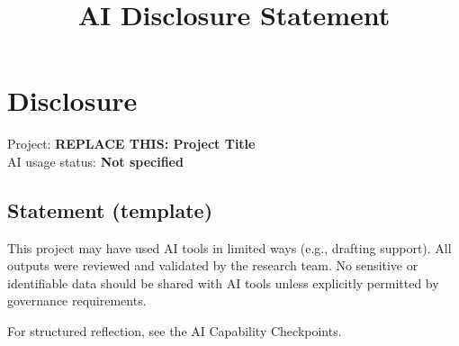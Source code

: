 \documentclass[
]{report}
\title{AI Disclosure Statement}
\author{}
\date{}
\renewcommand*\contentsname{Table of contents}
\newcommand\contentsname{Table of contents}
\begin{document}
\maketitle

\renewcommand*\contentsname{Table of contents}
{
\hypersetup{linkcolor=}
\setcounter{tocdepth}{2}
\tableofcontents
}

\chapter{Disclosure}\label{disclosure}

Project: \textbf{REPLACE THIS: Project Title}\\
AI usage status: \textbf{Not specified}

\section{Statement (template)}\label{statement-template}

This project may have used AI tools in limited ways (e.g., drafting
support). All outputs were reviewed and validated by the research team.
No sensitive or identifiable data should be shared with AI tools unless
explicitly permitted by governance requirements.

For structured reflection, see the AI Capability Checkpoints.
\end{document}
